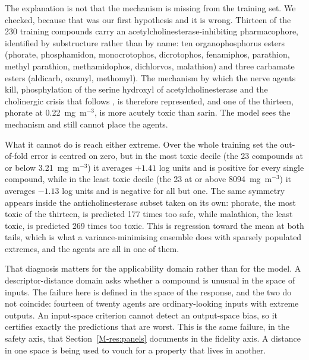 \documentclass[journal=jacsat,manuscript=suppinfo,margin=1in]{achemso}
\begin{document}
\begin{sloppypar}
The explanation is not that the mechanism is missing from the training set. We
checked, because that was our first hypothesis and it is wrong. Thirteen of the
230 training compounds carry an acetylcholinesterase-inhibiting pharmacophore,
identified by substructure rather than by name: ten organophosphorus esters
(phorate, phosphamidon, monocrotophos, dicrotophos, fenamiphos, parathion,
methyl parathion, methamidophos, dichlorvos, malathion) and three carbamate
esters (aldicarb, oxamyl, methomyl). The mechanism by which the nerve agents
kill, phosphylation of the serine hydroxyl of acetylcholinesterase and the
cholinergic crisis that follows \cite{bajgar2004,thiermann2013,worek2020},
is therefore represented, and one of
the thirteen, phorate at 0.22~mg~m$^{-3}$, is more acutely toxic than sarin. The
model sees the mechanism and still cannot place the agents.
\end{sloppypar}

What it cannot do is reach either extreme. Over the whole training set the
out-of-fold error is centred on zero, but in the most toxic decile
(the 23 compounds at or below 3.21~mg~m$^{-3}$) it averages $+1.41$ log units
and is positive for every single compound, while in the least toxic decile (the
23 at or above 8094~mg~m$^{-3}$) it averages $-1.13$ log units and is negative
for all but one. The same symmetry appears inside the anticholinesterase subset
taken on its own: phorate, the most toxic of the thirteen, is predicted 177 times
too safe, while malathion, the least toxic, is predicted 269 times too toxic.
This is regression toward the mean at both tails, which is what a
variance-minimising ensemble does with sparsely populated extremes, and the
agents are all in one of them.

That diagnosis matters for the applicability domain rather than for the model.
A descriptor-distance domain asks whether a compound is unusual in the space of
inputs. The failure here is defined in the space of the response, and the two do
not coincide: fourteen of twenty agents are ordinary-looking inputs with
extreme outputs. An input-space criterion cannot detect an output-space bias, so
it certifies exactly the predictions that are worst. This is the same failure, in
the safety axis, that Section~\ref{M-res:panels} documents in the fidelity axis.
A distance in one space is being used to vouch for a property that lives in
another.
\end{document}
